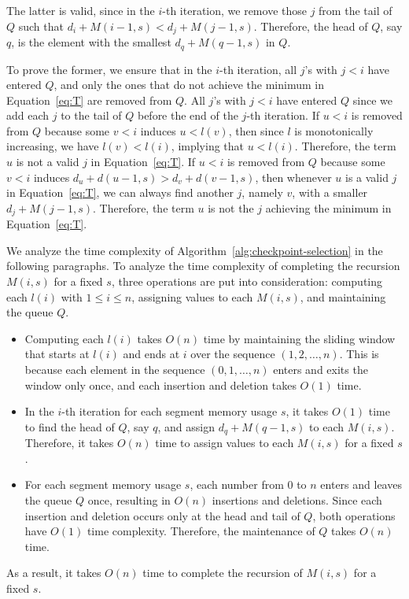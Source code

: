 The latter is valid, since in the $i$-th iteration, we remove those $j$ from the tail of $Q$ such that $d_i + M(i - 1, s) < d_j + M(j - 1, s)$.
Therefore, the head of $Q$, say $q$, is the element with the smallest $d_q + M(q - 1, s)$ in $Q$.

To prove the former, we ensure that in the $i$-th iteration, all $j$'s with $j < i$ have entered $Q$, and only the ones that do not achieve the minimum in Equation~\ref{eq:T} are removed from $Q$.
All $j$'s with $j < i$ have entered $Q$ since we add each $j$ to the tail of $Q$ before the end of the $j$-th iteration.
If $u < i$ is removed from $Q$ because some $v < i$ induces $u < l(v)$, then since $l$ is monotonically increasing, we have $l(v) < l(i)$, implying that $u < l(i)$.
Therefore, the term $u$ is not a valid $j$ in Equation~\ref{eq:T}.
If $u < i$ is removed from $Q$ because some $v < i$ induces $d_u + d(u - 1, s) > d_v + d(v - 1, s)$, then whenever $u$ is a valid $j$ in Equation~\ref{eq:T}, we can always find another $j$, namely $v$, with a smaller $d_j + M(j - 1, s)$.
Therefore, the term $u$ is not the $j$ achieving the minimum in Equation~\ref{eq:T}.

We analyze the time complexity of Algorithm~\ref{alg:checkpoint-selection} in the following paragraphs.
To analyze the time complexity of completing the recursion $M(i, s)$ for a fixed $s$, three operations are put into consideration: computing each $l(i)$ with $1 \leq i\leq n$, assigning values to each $M(i, s)$, and maintaining the queue $Q$.
\begin{itemize}
\item Computing each $l(i)$ takes $O(n)$ time by maintaining the sliding window that starts at $l(i)$ and ends at $i$ over the sequence $(1, 2,\dots, n)$.
This is because each element in the sequence $(0, 1,\dots, n)$ enters and exits the window only once, and each insertion and deletion takes $O(1)$ time.
\item In the $i$-th iteration for each segment memory usage $s$, it takes $O(1)$ time to find the head of $Q$, say $q$, and assign $d_q + M(q - 1, s)$ to each $M(i, s)$.
Therefore, it takes $O(n)$ time to assign values to each $M(i, s)$ for a fixed $s$.
\item For each segment memory usage $s$, each number from $0$ to $n$ enters and leaves the queue $Q$ once, resulting in $O(n)$ insertions and deletions.
Since each insertion and deletion occurs only at the head and tail of $Q$, both operations have $O(1)$ time complexity.
Therefore, the maintenance of $Q$ takes $O(n)$ time.
\end{itemize}
As a result, it takes $O(n)$ time to complete the recursion of $M(i, s)$ for a fixed $s$.

